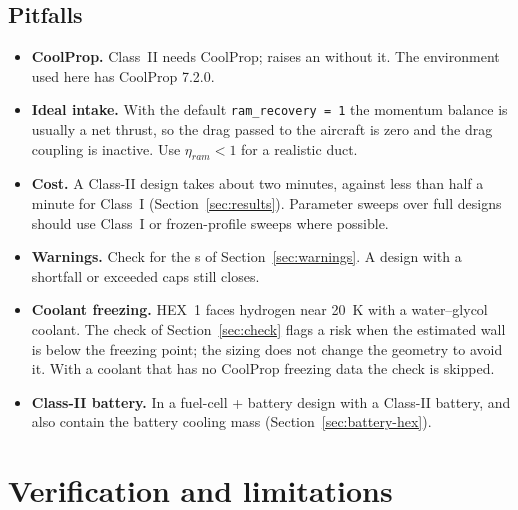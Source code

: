 \documentclass[a4paper,11pt]{article}
\begin{document}
\subsection{Pitfalls}
\begin{itemize}
\item \textbf{CoolProp.} Class~II needs CoolProp;  raises an
   without it. The environment used here has CoolProp 7.2.0.
\item \textbf{Ideal intake.} With the default \texttt{ram\_recovery = 1} the momentum balance
  is usually a net thrust, so the drag passed to the aircraft is zero and the drag coupling
  is inactive. Use $\eta_{ram} < 1$ for a realistic duct.
\item \textbf{Cost.} A Class-II design takes about two minutes, against less than half a minute for
  Class~I (Section~\ref{sec:results}). Parameter sweeps over full designs should use
  Class~I or frozen-profile sweeps where possible.
\item \textbf{Warnings.} Check for the s of
  Section~\ref{sec:warnings}. A design with a shortfall or exceeded caps still closes.
\item \textbf{Coolant freezing.} HEX~1 faces hydrogen near \SI{20}{K} with a water--glycol
  coolant. The check of Section~\ref{sec:check} flags a risk when the estimated wall is below
  the freezing point; the sizing does not change the geometry to avoid it. With a coolant that
  has no CoolProp freezing data the check is skipped.
\item \textbf{Class-II battery.} In a fuel-cell + battery design with a Class-II battery,
   and  also contain the battery cooling mass
  (Section~\ref{sec:battery-hex}).
\end{itemize}

\section{Verification and limitations}\label{sec:verification}
\end{document}
